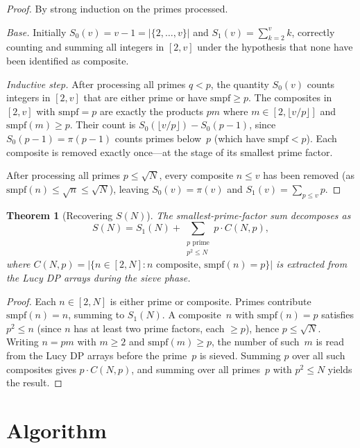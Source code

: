 \documentclass[11pt]{article}
\newtheorem{theorem}{Theorem}
\begin{document}
\begin{proof}
By strong induction on the primes processed.

\emph{Base.} Initially $S_0(v) = v - 1 = |\{2,\ldots,v\}|$ and $S_1(v) = \sum_{k=2}^{v}k$, correctly counting and summing all integers in $[2,v]$ under the hypothesis that none have been identified as composite.

\emph{Inductive step.} After processing all primes $q < p$, the quantity $S_0(v)$ counts integers in $[2,v]$ that are either prime or have $\mathrm{smpf} \ge p$. The composites in $[2,v]$ with $\mathrm{smpf} = p$ are exactly the products $pm$ where $m \in [2,\lfloor v/p\rfloor]$ and $\mathrm{smpf}(m) \ge p$. Their count is $S_0(\lfloor v/p\rfloor) - S_0(p-1)$, since $S_0(p-1) = \pi(p-1)$ counts primes below~$p$ (which have $\mathrm{smpf} < p$). Each composite is removed exactly once---at the stage of its smallest prime factor.

After processing all primes $p \le \sqrt{N}$, every composite $n \le v$ has been removed (as $\mathrm{smpf}(n) \le \sqrt{n} \le \sqrt{N}$), leaving $S_0(v) = \pi(v)$ and $S_1(v) = \sum_{p \le v}p$.
\end{proof}

\begin{theorem}[Recovering $S(N)$]\label{thm:recover}
The smallest-prime-factor sum decomposes as
\[
S(N) = S_1(N) + \sum_{\substack{p \text{ prime} \\ p^2 \le N}} p \cdot C(N,p),
\]
where $C(N,p) = |\{n \in [2,N] : n \text{ composite},\, \mathrm{smpf}(n) = p\}|$ is extracted from the Lucy DP arrays during the sieve phase.
\end{theorem}

\begin{proof}
Each $n \in [2,N]$ is either prime or composite. Primes contribute $\mathrm{smpf}(n) = n$, summing to $S_1(N)$. A composite~$n$ with $\mathrm{smpf}(n) = p$ satisfies $p^2 \le n$ (since $n$ has at least two prime factors, each $\ge p$), hence $p \le \sqrt{N}$. Writing $n = pm$ with $m \ge 2$ and $\mathrm{smpf}(m) \ge p$, the number of such~$m$ is read from the Lucy DP arrays before the prime~$p$ is sieved. Summing $p$ over all such composites gives $p \cdot C(N,p)$, and summing over all primes~$p$ with $p^2 \le N$ yields the result.
\end{proof}

\section{Algorithm}
\end{document}
